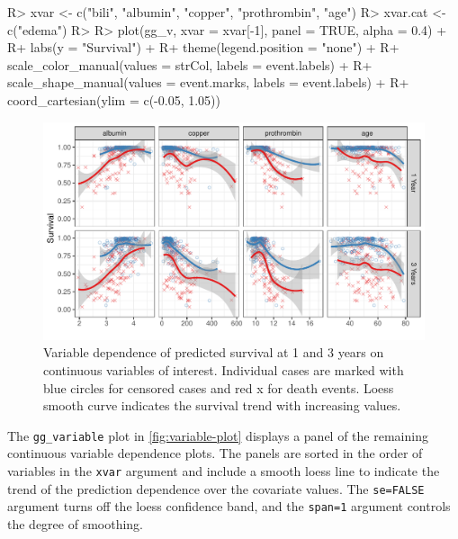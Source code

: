 \documentclass[article, nojss]{jss}
\begin{document}
\begin{Schunk}
\begin{Sinput}
R> xvar <- c("bili", "albumin", "copper", "prothrombin", "age")
R> xvar.cat <- c("edema")
R>
R> plot(gg_v, xvar = xvar[-1], panel = TRUE, alpha = 0.4) +
R+   labs(y = "Survival") +
R+   theme(legend.position = "none") +
R+   scale_color_manual(values = strCol, labels = event.labels) +
R+   scale_shape_manual(values = event.marks, labels = event.labels) +
R+   coord_cartesian(ylim = c(-0.05, 1.05))
\end{Sinput}
\begin{figure}[!htb]

{\centering \includegraphics{rfs-variable-plot-1}

}

\caption[Variable dependence of predicted survival at 1 and 3 years on continuous variables of interest]{Variable dependence of predicted survival at 1 and 3 years on continuous variables of interest. Individual cases are marked with blue circles for censored cases and red x for death events. Loess smooth curve indicates the survival trend with increasing values.}\label{fig:variable-plot}
\end{figure}
\end{Schunk}

The \texttt{gg\_variable} plot in \autoref{fig:variable-plot} displays a
panel of the remaining continuous variable dependence plots. The panels
are sorted in the order of variables in the \texttt{xvar} argument and
include a smooth loess line \citep{cleveland:1981, cleveland:1988} to
indicate the trend of the prediction dependence over the covariate
values. The \texttt{se=FALSE} argument turns off the loess confidence
band, and the \texttt{span=1} argument controls the degree of smoothing.
\end{document}
